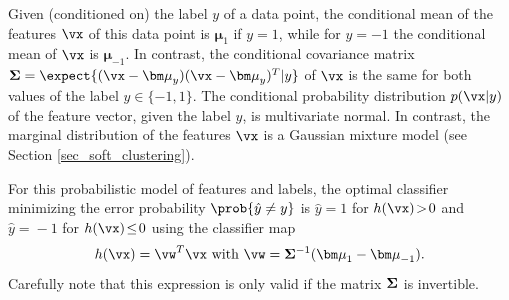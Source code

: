 \documentclass[12pt]{report}
\begin{document}
Given (conditioned on) the label $y$ of a data point, the conditional mean 
of the features  $\vx$ of this data point is ${\bm \mu}_{1}$ if $y=1$, while 
for $y=-1$ the conditional mean of $\vx$ is ${\bm \mu}_{-1}$. In contrast, the 
conditional covariance matrix ${\bf \Sigma} = \expect\{ (\vx-{\bm \mu}_{y})(\vx-{\bm \mu}_{y})^{T}|y \}$ 
of $\vx$ is the same for both values of the label $y \in \{-1,1\}$. 
The conditional probability distribution $p(\vx|y)$ of the feature vector, 
given the label $y$, is multivariate normal. In contrast, the marginal distribution 
of the features $\vx$ is a Gaussian mixture model (see Section \ref{sec_soft_clustering}).


For this probabilistic model of features and labels, the optimal classifier minimizing the 
error probability $\prob{\hat{y} \neq y}$ is $\hat{y}\!=\!1$ for $h(\vx)\!>\!0$ and $\hat{y}\!=\!-1$ 
for $h(\vx)\!\leq\!0$ using the classifier map 
\begin{equation}
\label{equ_classif_Bayes}
h(\vx) = \vw^{T} \vx \mbox{ with } \vw =  {\bf \Sigma}^{-1} ({\bm \mu}_{1} - {\bm \mu}_{-1}). 
\end{equation}
Carefully note that this expression is only valid if the matrix ${\bf \Sigma}$ is 
invertible.
\end{document}
